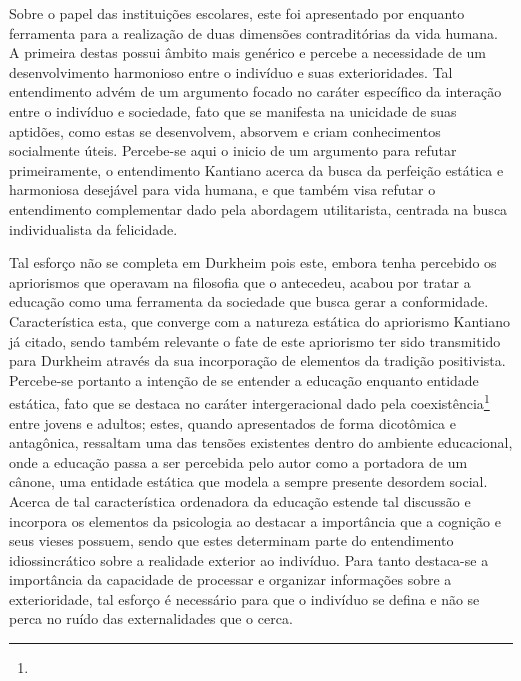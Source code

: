 \documentclass[
  12pt,       %
  openright,      %
  twoside,      %
  a4paper,      %
  english,      %
  french,       %
  spanish,      %
  brazil        %
  ]{abntex2}
\begin{document}
Sobre o papel das instituições escolares, este foi apresentado por  enquanto ferramenta para a realização de duas dimensões contraditórias da vida humana. A primeira destas possui âmbito mais genérico e percebe a necessidade de um desenvolvimento harmonioso entre o indivíduo e suas exterioridades. Tal entendimento advém de um argumento focado no caráter específico da interação entre o indivíduo e sociedade, fato que se manifesta na unicidade de suas aptidões, como estas se desenvolvem, absorvem e criam conhecimentos socialmente úteis. Percebe-se aqui o inicio de um argumento para refutar primeiramente, o entendimento Kantiano acerca da busca da perfeição estática e harmoniosa desejável para vida humana, e que também visa refutar o entendimento complementar dado pela abordagem utilitarista, centrada na busca individualista da felicidade. 

Tal esforço não se completa em Durkheim pois este, embora tenha percebido os apriorismos que operavam na filosofia que o antecedeu, acabou por tratar a educação como uma ferramenta da sociedade que busca gerar a conformidade. Característica esta, que converge com a natureza estática do apriorismo Kantiano já citado, sendo também relevante o fate de este apriorismo ter sido transmitido para Durkheim através da sua incorporação de elementos da tradição positivista. Percebe-se portanto a intenção de se entender a educação enquanto entidade estática, fato que se destaca no caráter intergeracional dado pela coexistência\footnote{} entre jovens e adultos; estes, quando apresentados de forma dicotômica e antagônica, ressaltam uma das tensões existentes dentro do ambiente educacional, onde a educação passa a ser percebida pelo autor como a portadora de um cânone, uma entidade estática que modela a sempre presente desordem social. Acerca de tal característica ordenadora da educação  estende tal discussão e incorpora os elementos da psicologia ao destacar a importância que a cognição e seus vieses possuem, sendo que estes determinam parte do entendimento idiossincrático sobre a realidade exterior ao indivíduo. Para tanto destaca-se a importância da capacidade de processar e organizar informações sobre a exterioridade, tal esforço é necessário para que o indivíduo se defina e não se perca no ruído das externalidades que o cerca. 
\end{document}
